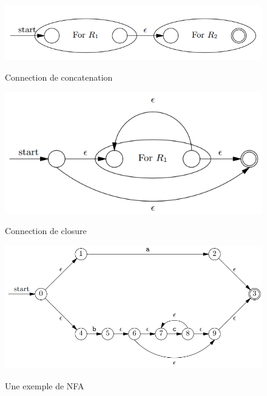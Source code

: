\documentclass[14px]{article}
\begin{document}
\begin{figure}[H]
	\begin{minipage}[H]{0.4\linewidth}
		\centering
		\includegraphics[width=\textwidth]{Connection2.png}
		\caption{Connection de concatenation}
		\label{img3}
	\end{minipage}
	\begin{minipage}[H]{0.4\linewidth}
		\centering
		\includegraphics[width=\textwidth]{Connection3.png}\\
		\caption{Connection de closure}
		\label{img4}
	\end{minipage}
\end{figure}

\begin{figure}[H]
	\begin{minipage}[H]{0.8\linewidth}
		\centering
		\includegraphics[width=\textwidth]{exempleAutomate.png}\\
		\caption{Une exemple de NFA}
		\label{img5}
	\end{minipage}
\end{figure}
\end{document}
